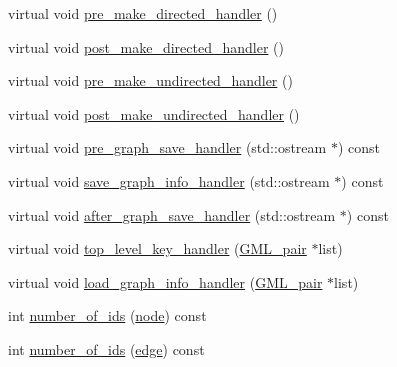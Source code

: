 \begin{DoxyCompactItemize}
virtual void \mbox{\hyperlink{classgraph_a505198f412b1e426e9d09b62ea9811e8}{pre\+\_\+make\+\_\+directed\+\_\+handler}} ()
\item 
virtual void \mbox{\hyperlink{classgraph_a43dc35def3d8125eb8f3841d55e0b1c8}{post\+\_\+make\+\_\+directed\+\_\+handler}} ()
\item 
virtual void \mbox{\hyperlink{classgraph_a8964107991e6f411ba8992f6b1deda21}{pre\+\_\+make\+\_\+undirected\+\_\+handler}} ()
\item 
virtual void \mbox{\hyperlink{classgraph_a3d2bc348d12931aff1d2e97a6b4285c3}{post\+\_\+make\+\_\+undirected\+\_\+handler}} ()
\item 
virtual void \mbox{\hyperlink{classgraph_ab257e02f6fd04fef244032a3a15bec9f}{pre\+\_\+graph\+\_\+save\+\_\+handler}} (std\+::ostream $\ast$) const
\item 
virtual void \mbox{\hyperlink{classgraph_a0f20022d6f4951b8836a204aa85b7693}{save\+\_\+graph\+\_\+info\+\_\+handler}} (std\+::ostream $\ast$) const
\item 
virtual void \mbox{\hyperlink{classgraph_af0c7aba21d57d827ae96cae632441651}{after\+\_\+graph\+\_\+save\+\_\+handler}} (std\+::ostream $\ast$) const
\item 
virtual void \mbox{\hyperlink{classgraph_a33bc9b45f0d4738c491535147b703cc5}{top\+\_\+level\+\_\+key\+\_\+handler}} (\mbox{\hyperlink{struct_g_m_l__pair}{G\+M\+L\+\_\+pair}} $\ast$list)
\item 
virtual void \mbox{\hyperlink{classgraph_aaca9ede8005388fd22b56e12280bf1bf}{load\+\_\+graph\+\_\+info\+\_\+handler}} (\mbox{\hyperlink{struct_g_m_l__pair}{G\+M\+L\+\_\+pair}} $\ast$list)
\item 
int \mbox{\hyperlink{classgraph_a82f09714f50dbe41e1a9cbcb12ad0866}{number\+\_\+of\+\_\+ids}} (\mbox{\hyperlink{classnode}{node}}) const
\item 
int \mbox{\hyperlink{classgraph_a8db97e43b31c95ac6b0bd1820aa5224b}{number\+\_\+of\+\_\+ids}} (\mbox{\hyperlink{classedge}{edge}}) const
\end{DoxyCompactItemize}
